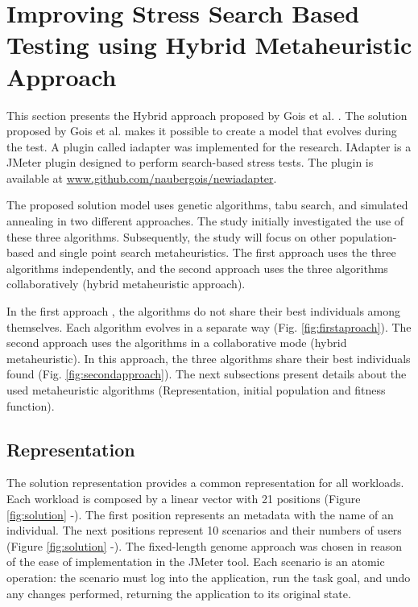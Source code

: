 \documentclass{bmcart}
\begin{document}
\section{Improving Stress Search Based Testing using Hybrid Metaheuristic Approach}

This section presents the Hybrid approach proposed by Gois et al. \citep{Gois2016}. The solution proposed by Gois et al. makes it possible to create a model that evolves during the test. A plugin called iadapter was implemented for the research. IAdapter is a JMeter plugin designed to perform search-based stress tests.  The plugin is available at \url{www.github.com/naubergois/newiadapter}.  


The proposed solution model uses genetic algorithms, tabu search, and simulated annealing in two different approaches. The study initially investigated the use of these three algorithms. Subsequently, the study will focus on other population-based and single point search metaheuristics. The first approach uses the three algorithms independently, and the second approach uses the three algorithms collaboratively (hybrid metaheuristic approach).

In the first approach , the algorithms do not share their best individuals among themselves. Each algorithm evolves in a separate way (Fig. \ref{fig:firstaproach}). The second approach uses the algorithms in a collaborative mode (hybrid metaheuristic). In this approach, the three algorithms share their best individuals found (Fig. \ref{fig:secondapproach}). The next subsections present details about the used metaheuristic algorithms (Representation, initial population and fitness function).


\subsection{Representation}

The solution representation provides a common representation for all workloads. Each workload is composed by a linear vector with 21 positions (Figure \ref{fig:solution}  -). The first position represents an metadata with the name of an individual. The next positions represent 10 scenarios and their numbers of users (Figure \ref{fig:solution}  -). The fixed-length genome approach was chosen in reason of the ease of implementation in the JMeter tool. Each scenario is an atomic operation: the scenario must log into the application, run the task goal, and undo any changes performed, returning the application to its original state. 
\end{document}
